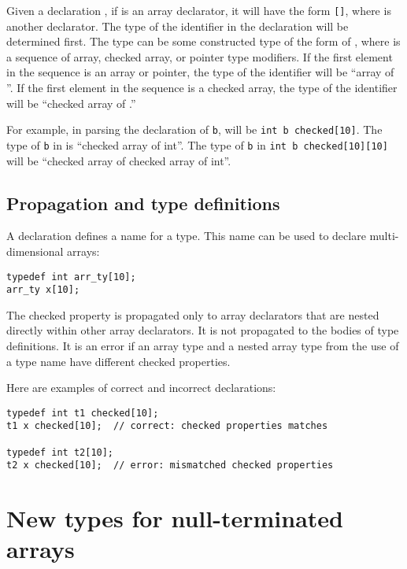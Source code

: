 Given a declaration  , if  is an array
declarator, it will have the form
\texttt{[]},
where  is another declarator. The type of the identifier in the
declaration  will be determined first. The type can be some
constructed type of the form  of , where
 is a sequence of array, checked array, or pointer
type modifiers. If the first element in the 
sequence is an array or pointer, the type of the identifier will be
 ``array of  ''. If the first element in the
 sequence is a checked array, the type of the
identifier will be  ``checked array of .''

For example, in parsing the declaration of \texttt{b}, 
will be \texttt{int b checked[10]}. The type of \texttt{b} in
 is ``checked array of int''. The type of \texttt{b} in
\texttt{int b checked[10][10]} will be ``checked array of
checked array of int''.

\subsection{Propagation and type definitions}

A  declaration defines a name for a type. This name
can be used to declare multi-dimensional arrays:
\begin{verbatim}
typedef int arr_ty[10];
arr_ty x[10];
\end{verbatim}
The checked property is propagated only to array declarators that are 
nested directly within other array declarators.   It is not propagated to
the bodies of type definitions.  It is an error if an array type and a nested 
array type from the use of a type name have different checked properties.

Here are examples of correct and incorrect declarations:
\begin{verbatim}
typedef int t1 checked[10];
t1 x checked[10];  // correct: checked properties matches

typedef int t2[10];
t2 x checked[10];  // error: mismatched checked properties
\end{verbatim}

\section{New types for null-terminated arrays}
\label{section:nullterm-types}

